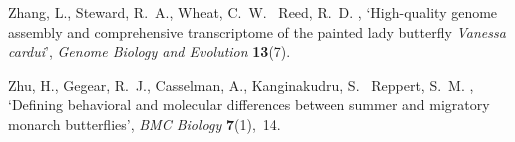 \documentclass[twocolumn]{bmcart}%
\begin{document}
\begin{backmatter}
\begin{thebibliography}{xx}
Zhang, L., Steward, R.~A., Wheat, C.~W. \harvardand\ Reed, R.~D.
  \harvardyearleft 2021\harvardyearright , `High-quality genome assembly and
  comprehensive transcriptome of the painted lady butterfly \textit{Vanessa
  cardui}', {\em Genome Biology and Evolution} {\bf 13}(7).

Zhu, H., Gegear, R.~J., Casselman, A., Kanginakudru, S. \harvardand\ Reppert,
  S.~M.  \harvardyearleft 2009\harvardyearright , `Defining behavioral and
  molecular differences between summer and migratory monarch butterflies', {\em
  BMC Biology} {\bf 7}(1),~14.

\end{thebibliography}


\end{backmatter}
\end{document}
